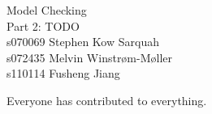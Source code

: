 \documentclass[11pt]{article}
\begin{document}
{\center \Large {} Model Checking \\[5mm]
Part 2: TODO \\[5mm]
s070069 Stephen Kow Sarquah \\
s072435 Melvin Winstrøm-Møller \\
s110114 Fusheng Jiang \\}

Everyone has contributed to everything.

\setcounter{secnumdepth}{0}

\tableofcontents




\end{document}
